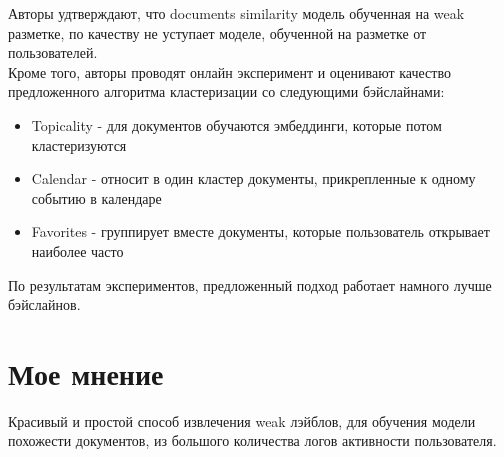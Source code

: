 Авторы удтверждают, что documents similarity модель обученная на weak разметке, по качеству не уступает моделе, обученной на разметке от пользователей. \\

Кроме того, авторы проводят онлайн эксперимент и оценивают качество предложенного алгоритма кластеризации со следующими бэйслайнами:

\begin{itemize}
    \item Topicality - для документов обучаются эмбеддинги, которые потом кластеризуются
    \item Calendar - относит в один кластер документы, прикрепленные к одному событию в календаре
    \item Favorites - группирует вместе документы, которые пользователь открывает наиболее часто
\end{itemize}

По результатам экспериментов, предложенный подход работает намного лучше бэйслайнов.

\section*{Мое мнение}

Красивый и простой способ извлечения weak лэйблов, для обучения модели похожести документов, из большого количества логов активности пользователя.
